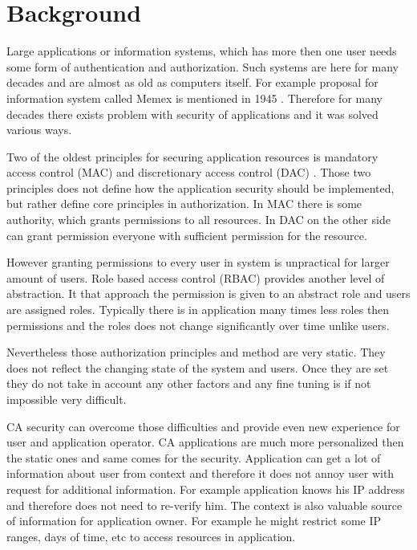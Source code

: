 \documentclass{poster15}
\begin{document}
\section{Background}

Large applications or information systems, which has more then one user needs some form of authentication and authorization. Such systems are here for many decades and are almost as old as computers itself. For example proposal for information system called Memex is mentioned in 1945 \cite{memex}. Therefore for many decades there exists problem with security of applications and it was solved various ways.

Two of the oldest principles for securing application resources is mandatory access control (MAC) \cite{accesscontrol} and discretionary access control (DAC) \cite{accesscontrol}. Those two principles does not define how the application security should be implemented, but rather define core principles in authorization. In MAC there is some authority, which grants permissions to all resources. In DAC on the other side can grant permission everyone with sufficient permission for the resource.

However granting permissions to every user in system is unpractical for larger amount of users. Role based access control (RBAC) \cite{rbac} provides another level of abstraction. It that approach the permission is given to an abstract role and users are assigned roles. Typically there is in application many times less roles then permissions and the roles does not change significantly over time unlike users.

Nevertheless those authorization principles and method are very static. They does not reflect the changing state of the system and users. Once they are set they do not take in account any other factors and any fine tuning is if not impossible very difficult.

CA security can overcome those difficulties and provide even new experience for user and application operator. CA applications are much more personalized then the static ones and same comes for the security. Application can get a lot of information about user from context and therefore it does not annoy user with request for additional information. For example application knows his IP address and therefore does not need to re-verify him. The context is also valuable source of information for application owner. For example he might restrict some IP ranges, days of time, etc to access resources in application. 
\end{document}
